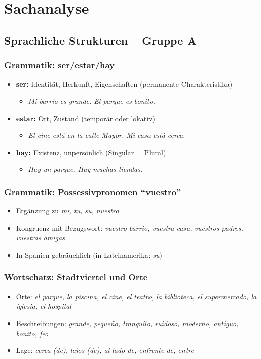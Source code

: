 \documentclass[11pt,a4paper]{article}
\begin{document}
\section{Sachanalyse}

\subsection{Sprachliche Strukturen -- Gruppe A}

\subsubsection{Grammatik: ser/estar/hay}
\begin{itemize}
    \item \textbf{ser:} Identität, Herkunft, Eigenschaften (permanente Charakteristika)
    \begin{itemize}
        \item \textit{Mi barrio es grande. El parque es bonito.}
    \end{itemize}
    \item \textbf{estar:} Ort, Zustand (temporär oder lokativ)
    \begin{itemize}
        \item \textit{El cine está en la calle Mayor. Mi casa está cerca.}
    \end{itemize}
    \item \textbf{hay:} Existenz, unpersönlich (Singular = Plural)
    \begin{itemize}
        \item \textit{Hay un parque. Hay muchas tiendas.}
    \end{itemize}
\end{itemize}

\subsubsection{Grammatik: Possessivpronomen ``vuestro''}
\begin{itemize}
    \item Ergänzung zu \textit{mi, tu, su, nuestro}
    \item Kongruenz mit Bezugswort: \textit{vuestro barrio, vuestra casa, vuestros padres, vuestras amigas}
    \item In Spanien gebräuchlich (in Lateinamerika: \textit{su})
\end{itemize}

\subsubsection{Wortschatz: Stadtviertel und Orte}
\begin{itemize}
    \item Orte: \textit{el parque, la piscina, el cine, el teatro, la biblioteca, el supermercado, la iglesia, el hospital}
    \item Beschreibungen: \textit{grande, pequeño, tranquilo, ruidoso, moderno, antiguo, bonito, feo}
    \item Lage: \textit{cerca (de), lejos (de), al lado de, enfrente de, entre}
\end{itemize}
\end{document}
